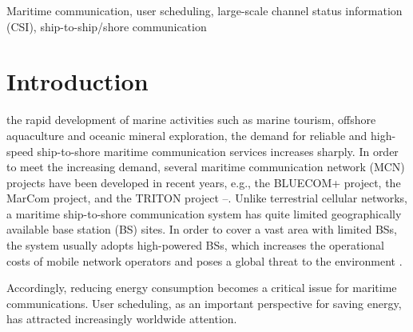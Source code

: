 \documentclass{ieeeaccess}
\begin{document}
\begin{keywords}
Maritime communication, user scheduling, large-scale channel status information (CSI), ship-to-ship/shore communication
\end{keywords}

\titlepgskip=-15pt

\maketitle

\section{Introduction}
 the rapid development of marine activities such as marine tourism, offshore aquaculture and oceanic mineral exploration, the demand for reliable and high-speed ship-to-shore maritime communication services increases sharply. In order to meet the increasing demand, several maritime communication network (MCN) projects have been developed in recent years, e.g., the BLUECOM+ project, the MarCom project, and the TRITON project \cite{p321}--\cite{p32}.
Unlike terrestrial cellular networks, a maritime ship-to-shore communication system has quite limited geographically available base station (BS) sites. In order to cover a vast area with limited BSs, the system usually adopts high-powered BSs, which increases the operational costs of mobile network operators and poses a global threat to the environment \cite{p33}.

Accordingly, reducing energy consumption becomes a critical issue for maritime communications. User scheduling, as an important perspective for saving energy, has attracted increasingly worldwide attention. 
\end{document}
